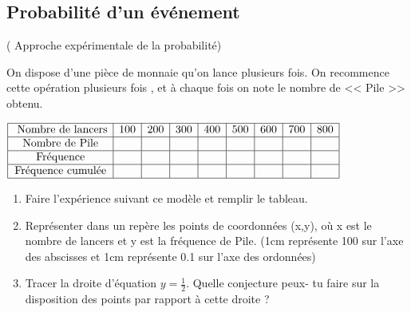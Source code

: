 \subsection{Probabilité d’un événement}
  ( Approche expérimentale de la probabilité)
  \begin{lemma}
On dispose d’une pièce de monnaie qu’on lance plusieurs fois. On recommence cette opération plusieurs fois , et à chaque fois on note le nombre de << Pile >> obtenu.




$\begin{array}{|c|c|c|c|c|c|c|c|c|}
\hline
\text{ Nombre de  lancers} & 100 & 200 & 300 & 400 & 500 & 600 & 700 & 800 \\ \hline
\text{Nombre de Pile} & &&&&&&& \\ \hline
\text{Fréquence} & &&&&&&&\\ \hline
\text{Fréquence cumulée} &&&&&&&& \\ \hline
\end{array}$

\begin{enumerate}
\item Faire l'expérience suivant ce modèle  et remplir le tableau.
\item Représenter dans un repère les points de coordonnées (x,y), où x est le nombre de lancers et y est la fréquence de Pile.\; (1cm  représente 100 sur l'axe des abscisses  et 1cm représente 0.1 sur l'axe des ordonnées)
\item Tracer la droite d’équation $ y=\frac{1}{2} $.\; Quelle conjecture peux- tu faire sur la disposition des points par rapport à cette droite ? 
 
\end{enumerate}
\end{lemma}
